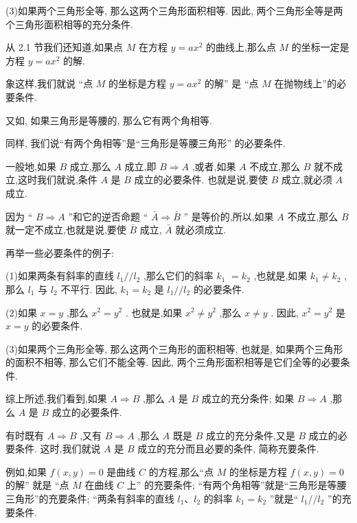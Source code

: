\documentclass[lang=cn,newtx,10pt,scheme=chinese]{elegantbook}
\begin{document}
(3)如果两个三角形全等, 那么这两个三角形面积相等. 因此, 两个三角形全等是两个三角形面积相等的充分条件.

从 2.1 节我们还知道,如果点 \(M\) 在方程 \(y = a{x}^{2}\) 的曲线上,那么点 \(M\) 的坐标一定是方程 \(y = a{x}^{2}\) 的解.

象这样,我们就说 “点 \(M\) 的坐标是方程 \(y = a{x}^{2}\) 的解” 是 “点 \(M\) 在抛物线上”的必要条件.

又如, 如果三角形是等腰的, 那么它有两个角相等.

同样, 我们说“有两个角相等”是“三角形是等腰三角形” 的必要条件.
\begin{definition}[必要条件]
一般地,如果 \(B\) 成立,那么 \(A\) 成立,即 \(B \Rightarrow A\) ,或者,如果 \(A\) 不成立,那么 \(B\) 就不成立,这时我们就说,条件 \(A\) 是 \(B\) 成立的必要条件. 也就是说,要使 \(B\) 成立,就必须 \(A\) 成立.
\end{definition}
\begin{corollary}[逆否命题等价性]
  因为 “ \(B \Rightarrow A\) ”和它的逆否命题 “ \(\bar{A} \Rightarrow \bar{B}\) ” 是等价的,所以,如果 \(A\) 不成立,那么 \(B\) 就一定不成立,也就是说,要使 \(\bar{B}\) 成立, \(\bar{A}\) 就必须成立.
\end{corollary}
再举一些必要条件的例子:

(1)如果两条有斜率的直线 \({l}_{1}//{l}_{2}\) ,那么它们的斜率 \({k}_{1}\) \(= {k}_{2}\) ,也就是,如果 \({k}_{1} \neq {k}_{2}\) ,那么 \({l}_{1}\) 与 \({l}_{2}\) 不平行. 因此, \({k}_{1} = {k}_{2}\) 是 \({l}_{1}//{l}_{2}\) 的必要条件.

(2)如果 \(x = y\) ,那么 \({x}^{2} = {y}^{2}\) . 也就是,如果 \({x}^{2} \neq {y}^{2}\) ,那么 \(x \neq y\) . 因此, \({x}^{2} = {y}^{2}\) 是 \(x = y\) 的必要条件.

(3)如果两个三角形全等, 那么这两个三角形的面积相等, 也就是, 如果两个三角形的面积不相等, 那么它们不能全等. 因此, 两个三角形面积相等是它们全等的必要条件.

综上所述,我们看到,如果 \(A \Rightarrow B\) ,那么 \(A\) 是 \(B\) 成立的充分条件; 如果 \(B \Rightarrow A\) ,那么 \(A\) 是 \(B\) 成立的必要条件.
\begin{definition}[充要条件]
  有时既有 \(A \Rightarrow B\) ,又有 \(B \Rightarrow A\) ,那么 \(A\) 既是 \(B\) 成立的充分条件,又是 \(B\) 成立的必要条件. 这时,我们就说 \(A\) 是 \(B\) 成立的充分而且必要的条件, 简称充要条件.
\end{definition}
例如,如果 \(f\left( {x,y}\right) = 0\) 是曲线 \(C\) 的方程,那么“点 \(M\) 的坐标是方程 \(f\left( {x,y}\right) = 0\) 的解” 就是 “点 \(M\) 在曲线 \(C\) 上” 的充要条件; “有两个角相等”就是“三角形是等腰三角形”的充要条件; “两条有斜率的直线 \({l}_{1}\text{、}{l}_{2}\) 的斜率 \({k}_{1} = {k}_{2}\) ”就是“ \({l}_{1}//{l}_{2}\) ”的充要条件.
\end{document}
